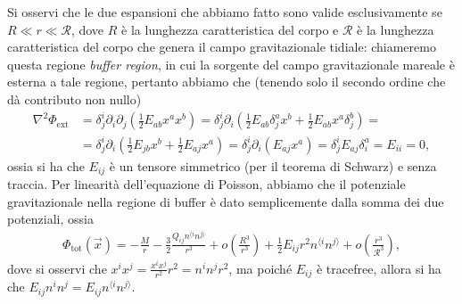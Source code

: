 Si osservi che le due espansioni che abbiamo fatto sono valide esclusivamente se $R \ll r \ll \mathcal{R}$, dove $R$ è la lunghezza caratteristica del corpo e $\mathcal{R}$ è la lunghezza caratteristica del corpo che genera il campo gravitazionale tidiale: chiameremo questa regione \emph{buffer region}, in cui la sorgente del campo gravitazionale mareale è esterna a tale regione, pertanto abbiamo che (tenendo solo il secondo ordine che dà contributo non nullo)
\begin{align}
	\nabla^2 \Phi_{\text{ext}} &= \delta_{j}^i \partial_{i} \partial_j \left( \frac{1}{2} E_{ab} x^a x^b \right) = \delta_j^i \partial_i \left( \frac12 E_{ab} \delta_j^a x^b + \frac12 E_{ab} x^a \delta_j^b \right) = \nonumber \\
	&= \delta_j^i \partial_i ( \frac12 E_{jb} x^b + \frac12 E_{aj} x^a) = \delta_j^i \partial_i (E_{aj} x^a) = \delta_j^i E_{aj} \delta_i^a = E_{ii} = 0,
\end{align}
ossia si ha che $E_{ij}$ è un tensore simmetrico (per il teorema di Schwarz) e senza traccia. Per linearità dell'equazione di Poisson, abbiamo che il potenziale gravitazionale nella regione di buffer è dato semplicemente dalla somma dei due potenziali, ossia
\begin{align} \label{eq:expansion_buffer}
	\Phi_{\text{tot}}(\vec{x}) = - \frac{M}{r} - \frac32 \frac{Q_{ij} n^{\langle i} n^{j \rangle}}{r^3} + o \left( \frac{R^3}{r^3} \right) + \frac12 E_{ij} r^2 n^{\langle i} n^{j \rangle} + o \left( \frac{r^3}{\mathcal{R}^3} \right), 
\end{align}
dove si osservi che $x^{i} x^j = \frac{x^i x^j}{r^2} r^2 = n^i n^j r^2$, ma poiché $E_{ij}$ è tracefree, allora si ha che $E_{ij} n^i n^j = E_{ij} n^{\langle i} n^{j \rangle}$.

